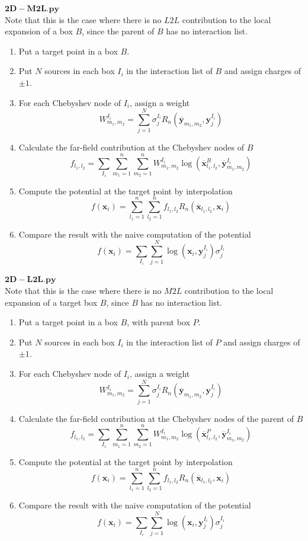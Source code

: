 \documentclass[11pt, oneside]{article}   	%
\begin{document}
\begin{appendices}
$\mathbf{2D-M2L.py}$\\
Note that this is the case where there is no $L2L$ contribution to the local expansion of a box $B$, since the parent of $B$ has no interaction list.
\begin{enumerate}
\item Put a target point in a box $B$.
\item Put $N$ sources in each box $I_i$ in the interaction list of $B$ and assign charges of $\pm 1$.
\item For each Chebyshev node of $I_i$, assign a weight
$$W^{I_i}_{m_1,m_2}=\sum_{j=1}^N \sigma^{I_i}_j R_n(\mathbf{\overline{y}}_{m_1,m_2},\mathbf{y}^{I_i}_j)$$
\item Calculate the far-field contribution at the Chebyshev nodes of $B$
$$f_{l_1,l_2}=\sum_{I_i}\sum_{m_1=1}^n\sum_{m_2=1}^n W^{I_i}_{m_1,m_2} \log(\mathbf{\overline{x}}^{B}_{l_1,l_2},\mathbf{\overline{y}}^{I_i}_{m_1,m_2})$$
\item Compute the potential at the target point by interpolation
$$f(\mathbf{x}_i)=\sum_{l_1=1}^n\sum_{l_2=1}^n f_{l_1,l_2} R_n(\mathbf{\overline{x}}_{l_1,l_2},\mathbf{x}_i)$$
\item Compare the result with the naive computation of the potential\\
$$f(\mathbf{x}_i)=\sum_{I_i}\sum_{j=1}^N \log(\mathbf{x}_i,\mathbf{y}^{I_i}_j) \sigma^{I_i}_j$$
\end{enumerate}

$\mathbf{2D-L2L.py}$\\
Note that this is the case where there is no $M2L$ contribution to the local expansion of a target box $B$, since $B$ has no interaction list. 
\begin{enumerate}
\item Put a target point in a box $B$, with parent box $P$.
\item Put $N$ sources in each box $I_i$ in the interaction list of $P$ and assign charges of $\pm 1$.
\item For each Chebyshev node of $I_i$, assign a weight
$$W^{I_i}_{m_1,m_2}=\sum_{j=1}^N \sigma^{I_i}_j R_n(\mathbf{\overline{y}}_{m_1,m_2},\mathbf{y}^{I_i}_j)$$
\item Calculate the far-field contribution at the Chebyshev nodes of the parent of $B$
$$f_{l_1,l_2}=\sum_{I_i}\sum_{m_1=1}^n\sum_{m_2=1}^n W^{I_i}_{m_1,m_2} \log(\mathbf{\overline{x}}^{P}_{l_1,l_2},\mathbf{\overline{y}}^{I_i}_{m_1,m_2})$$
\item Compute the potential at the target point by interpolation
$$f(\mathbf{x}_i)=\sum_{l_1=1}^n\sum_{l_2=1}^n f_{l_1,l_2} R_n(\mathbf{\overline{x}}_{l_1,l_2},\mathbf{x}_i)$$
\item Compare the result with the naive computation of the potential\\
$$f(\mathbf{x}_i)=\sum_{I_i}\sum_{j=1}^N \log(\mathbf{x}_i,\mathbf{y}^{I_i}_j) \sigma^{I_i}_j$$
\end{enumerate}


\end{appendices}
\end{document}
